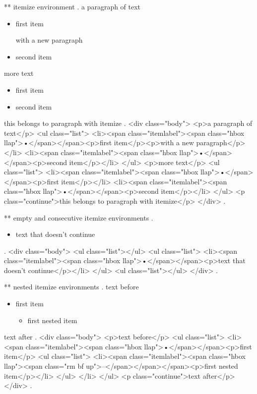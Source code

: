 ** itemize environment
.
a paragraph of text

\begin{itemize}
    \item first item

        with a new paragraph
    \item second item
\end{itemize}
%

more text

\begin{itemize}
    \item first item
    \item second item

\end{itemize}
this belongs to paragraph with itemize
.
<div class="body">
<p>a paragraph of text</p>
<ul class="list">
<li><span class="itemlabel"><span class="hbox llap">•</span></span><p>ﬁrst item</p><p>with a new paragraph</p></li>
<li><span class="itemlabel"><span class="hbox llap">•</span></span><p>second item</p></li>
</ul>
<p>more text</p>
<ul class="list">
<li><span class="itemlabel"><span class="hbox llap">•</span></span><p>ﬁrst item</p></li>
<li><span class="itemlabel"><span class="hbox llap">•</span></span><p>second item</p></li>
</ul>
<p class="continue">this belongs to paragraph with itemize</p>
</div>
.


** empty and consecutive itemize environments
.
\begin{itemize}

\end{itemize}
\begin{itemize}
    \item text that doesn't continue
\end{itemize}
\begin{itemize}
\end{itemize}
.
<div class="body">
<ul class="list"></ul>
<ul class="list">
<li><span class="itemlabel"><span class="hbox llap">•</span></span><p>text that doesn’t continue</p></li>
</ul>
<ul class="list"></ul>
</div>
.


** nested itemize environments
.
text before
\begin{itemize}
    \item first item
        \begin{itemize}
            \item first nested item
        \end{itemize}
\end{itemize}
text after
.
<div class="body">
<p>text before</p>
<ul class="list">
<li><span class="itemlabel"><span class="hbox llap">•</span></span><p>ﬁrst item</p>
<ul class="list">
<li><span class="itemlabel"><span class="hbox llap"><span class="rm bf up">–</span></span></span><p>ﬁrst nested item</p></li>
</ul>
</li>
</ul>
<p class="continue">text after</p>
</div>
.


